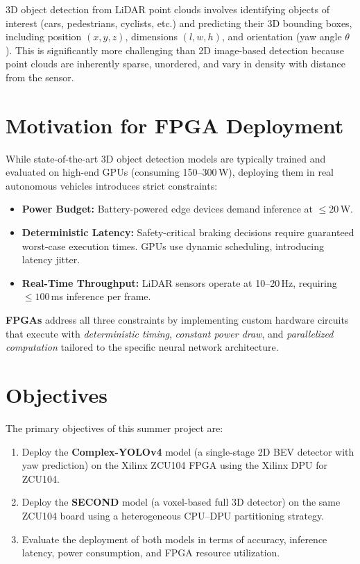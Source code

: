\documentclass[12pt, a4paper]{report}
\begin{document}
3D object detection from LiDAR point clouds involves identifying objects of interest (cars, pedestrians, cyclists, etc.) and predicting their 3D bounding boxes, including position $(x, y, z)$, dimensions $(l, w, h)$, and orientation (yaw angle $\theta$). This is significantly more challenging than 2D image-based detection because point clouds are inherently sparse, unordered, and vary in density with distance from the sensor.

\section{Motivation for FPGA Deployment}

While state-of-the-art 3D object detection models are typically trained and evaluated on high-end GPUs (consuming 150--300\,W), deploying them in real autonomous vehicles introduces strict constraints:

\begin{itemize}[nosep]
    \item \textbf{Power Budget:} Battery-powered edge devices demand inference at $\leq 20$\,W.
    \item \textbf{Deterministic Latency:} Safety-critical braking decisions require guaranteed worst-case execution times. GPUs use dynamic scheduling, introducing latency jitter.
    \item \textbf{Real-Time Throughput:} LiDAR sensors operate at 10--20\,Hz, requiring $\leq 100$\,ms inference per frame.
\end{itemize}

\textbf{FPGAs} address all three constraints by implementing custom hardware circuits that execute with \textit{deterministic timing}, \textit{constant power draw}, and \textit{parallelized computation} tailored to the specific neural network architecture.

\section{Objectives}

The primary objectives of this summer project are:

\begin{enumerate}[nosep]
    \item Deploy the \textbf{Complex-YOLOv4} model (a single-stage 2D BEV detector with yaw prediction) on the Xilinx ZCU104 FPGA using the Xilinx DPU for ZCU104.
    \item Deploy the \textbf{SECOND} model (a voxel-based full 3D detector) on the same ZCU104 board using a heterogeneous CPU--DPU partitioning strategy.
    \item Evaluate the deployment of both models in terms of accuracy, inference latency, power consumption, and FPGA resource utilization.
\end{enumerate}
\end{document}
